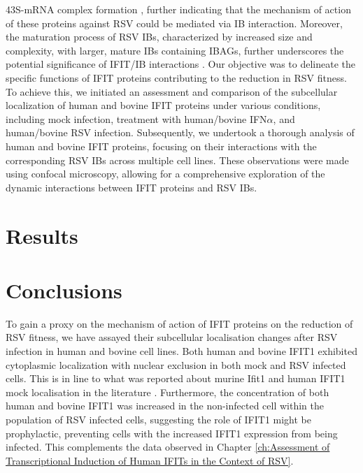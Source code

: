 43S-mRNA complex formation \cite{Diamond2014IFIT1:Translation, Guo2000CharacterizationVirus}, further indicating that the mechanism of action of these proteins against RSV could be mediated via IB interaction. Moreover, the maturation process of RSV IBs, characterized by increased size and complexity, with larger, mature IBs containing IBAGs, further underscores the potential significance of IFIT/IB interactions \cite{Rincheval2017FunctionalVirus, Jobe2021BovineResponses}. Our objective was to delineate the specific functions of IFIT proteins contributing to the reduction in RSV fitness. To achieve this, we initiated an assessment and comparison of the subcellular localization of human and bovine IFIT proteins under various conditions, including mock infection, treatment with human/bovine IFN\(\alpha\), and human/bovine RSV infection. Subsequently, we undertook a thorough analysis of human and bovine IFIT proteins, focusing on their interactions with the corresponding RSV IBs across multiple cell lines. These observations were made using confocal microscopy, allowing for a comprehensive exploration of the dynamic interactions between IFIT proteins and RSV IBs.

\section{Results} \label{sec:Results-Chapter3}



\section{Conclusions} \label{sec:Conclusions-Chapter3}

To gain a proxy on the mechanism of action of IFIT proteins on the reduction of RSV fitness, we have assayed their subcellular localisation changes after RSV infection in human and bovine cell lines. Both human and bovine IFIT1 exhibited cytoplasmic localization with nuclear exclusion in both mock and RSV infected cells. This is in line to what was reported about murine Ifit1 and human IFIT1 mock localisation in the literature \cite{Pichlmair2011IFIT1RNA, Terenzi2008Interferon-inducibleE1, Thul2017AProteome}. Furthermore, the concentration of both human and bovine IFIT1 was increased in the non-infected cell within the population of RSV infected cells, suggesting the role of IFIT1 might be prophylactic, preventing cells with the increased IFIT1 expression from being infected. This complements the data observed in Chapter \ref{ch:Assessment of Transcriptional Induction of Human IFITs in the Context of RSV}. 

